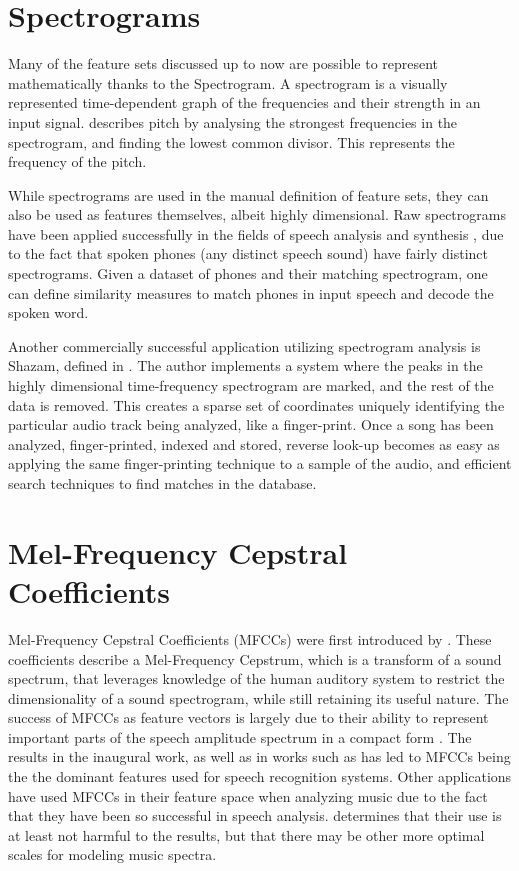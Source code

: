 \documentclass[twoside]{article}
\begin{document}
\begin{multicols}{2}
\section{Spectrograms}
Many of the feature sets discussed up to now are possible to represent mathematically thanks to the Spectrogram. A spectrogram is a visually represented time-dependent graph of the frequencies and their strength in an input signal. \citet{Wold96} describes pitch by analysing the strongest frequencies in the spectrogram, and finding the lowest common divisor. This represents the frequency of the pitch. 

While spectrograms are used in the manual definition of feature sets, they can also be used as features themselves, albeit highly dimensional. Raw spectrograms have been applied successfully in the fields of speech analysis and synthesis \citep{flanagan2013speech}, due to the fact that spoken phones (any distinct speech sound) have fairly distinct spectrograms. Given a dataset of phones and their matching spectrogram, one can define similarity measures to match phones in input speech and decode the spoken word.

Another commercially successful application utilizing spectrogram analysis is Shazam, defined in \citet{Shazam03}. The author implements a system where the peaks in the highly dimensional time-frequency spectrogram are marked, and the rest of the data is removed. This creates a sparse set of coordinates uniquely identifying the particular audio track being analyzed, like a finger-print. Once a song has been analyzed, finger-printed, indexed and stored, reverse look-up becomes as easy as applying the same finger-printing technique to a sample of the audio, and efficient search techniques to find matches in the database. 

\section{Mel-Frequency Cepstral Coefficients}
Mel-Frequency Cepstral Coefficients (MFCCs) were first introduced by \citet{Davis1980MFCC}. These coefficients describe a Mel-Frequency Cepstrum, which is a transform of a sound spectrum, that leverages knowledge of the human auditory system to restrict the dimensionality of a sound spectrogram, while still retaining its useful nature. The success of MFCCs as feature vectors is largely due to their ability to represent important parts of the speech amplitude spectrum in a compact form \citep{Logan2000mel}.  The results in the inaugural work, as well as in works such as \citet{Foote1997} has led to MFCCs being the the dominant features used for speech recognition systems. Other applications have used MFCCs in their feature space when analyzing music due to the fact that they have been so successful in speech analysis. \citet{Logan2000mel} determines that their use is at least not harmful to the results, but that there may be other more optimal scales for modeling music spectra.


\end{multicols}
\end{document}
